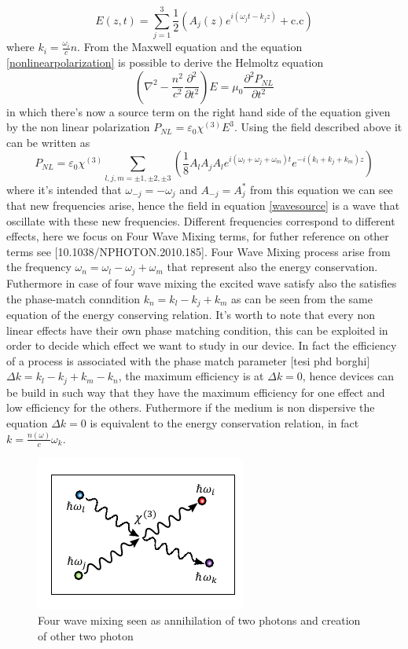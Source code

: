 \documentclass[12pt]{book}
\begin{document}
\begin{equation}E(z,t) = \sum_{j=1}^{3} \frac{1}{2}(A_j(z)e^{i(\omega_jt -k_jz)}+\text{c.c})\end{equation}
where $k_i = \frac{\omega_i}{c}n$. From the Maxwell equation and the equation \eqref{nonlinearpolarization} is possible to derive the Helmoltz equation
\begin{equation}\label{wavesource}\left(\nabla^2 - \frac{n^2}{c^2}\frac{\partial^2}{\partial t^2}\right)E = \mu_0\frac{\partial^2 P_{NL}}{\partial t^2}\end{equation}
in which there's now a source term on the right hand side of the equation given by the non linear polarization $P_{NL} = \varepsilon_0\chi^{(3)}E^3$. Using the field described above it can be written as
\begin{equation}P_{NL} = \varepsilon_0\chi^{(3)} \sum_{l,j,m=\pm1,\pm2,\pm3}\left(\frac{1}{8}A_lA_jA_l e^{i(\omega_l+\omega_j+\omega_m)t}e^{-i(k_l+k_j+k_m)z}\right)\end{equation}
where it's intended that $\omega_{-j} = -\omega_j$ and $A_{-j} = A^*_j$
from this equation we can see that new frequencies arise, hence the field in equation \eqref{wavesource} is a wave that oscillate with these new frequencies. Different frequencies correspond to different effects, here we focus on Four Wave Mixing terms, for futher reference on other terms see [10.1038/NPHOTON.2010.185]. Four Wave Mixing process arise from the frequency $\omega_n = \omega_l - \omega_j +\omega_m$ that represent also the energy conservation. Futhermore in case of four wave mixing the excited wave satisfy also the satisfies the phase-match conndition $k_n = k_l - k_j + k_m$ as can be seen from the same equation of the energy conserving relation. It's worth to note that every non linear effects have their own phase matching condition, this can be exploited in order to decide which effect we want to study in our device. In fact the efficiency of a process is associated with the phase match parameter [tesi phd borghi] $\Delta k = k_l - k_j + k_m -k_n$, the maximum efficiency is at $\Delta k = 0$, hence devices can be build in such way that they have the maximum efficiency for one effect and low efficiency for the others. Futhermore if the medium is non dispersive the equation $\Delta k = 0$ is equivalent to the energy conservation relation, in fact $k = \frac{n(\omega)}{c}\omega_k$.\\
\begin{figure}
\centering
\includegraphics[width = .4\textwidth]{img/FWMphotons}
\caption{Four wave mixing seen as annihilation of two photons and creation of other two photon}
\end{figure}
\end{document}
